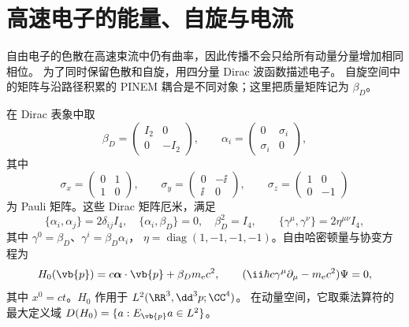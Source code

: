 \section{高速电子的能量、自旋与电流}\label{sec:feqo-primer-electron}

自由电子的色散在高速束流中仍有曲率，因此传播不会只给所有动量分量增加相同相位。
为了同时保留色散和自旋，用四分量 Dirac 波函数描述电子。
自旋空间中的矩阵与沿路径积累的 PINEM 耦合是不同对象；这里把质量矩阵记为 $\beta_D$。

\begin{definition}
在 Dirac 表象中取
\[
\beta_D=\begin{pmatrix}I_2&0\\0&-I_2\end{pmatrix},\qquad
\alpha_i=\begin{pmatrix}0&\sigma_i\\\sigma_i&0\end{pmatrix},
\]
其中
\[
\sigma_x=\begin{pmatrix}0&1\\1&0\end{pmatrix},\qquad
\sigma_y=\begin{pmatrix}0&-\ii\\\ii&0\end{pmatrix},\qquad
\sigma_z=\begin{pmatrix}1&0\\0&-1\end{pmatrix}
\]
为 Pauli 矩阵。这些 Dirac 矩阵厄米，满足
\begin{equation}
\{\alpha_i,\alpha_j\}=2\delta_{ij}I_4,\quad
\{\alpha_i,\beta_D\}=0,\quad \beta_D^2=I_4,
\qquad \{\gamma^\mu,\gamma^\nu\}=2\eta^{\mu\nu}I_4,
\label{eq:feqo-primer-clifford}
\end{equation}
其中 $\gamma^0=\beta_D$、$\gamma^i=\beta_D\alpha_i$，
$\eta=\operatorname{diag}(1,-1,-1,-1)$。自由哈密顿量与协变方程为
\begin{equation}
H_0(\vb{p})=c\boldsymbol\alpha\cdot\vb{p}+\beta_Dm_{\mathrm e}c^2,
\qquad (\ii\hbar c\gamma^\mu\partial_\mu-m_{\mathrm e}c^2)\Psi=0,
\label{eq:feqo-primer-dirac-free}
\end{equation}
其中 $x^0=ct$。$H_0$ 作用于 $L^2(\RR^3,\dd^3p;\CC^4)$。
在动量空间，它取乘法算符的最大定义域
$D(H_0)=\{a:E_{\vb{p}}a\in L^2\}$。
\end{definition}


